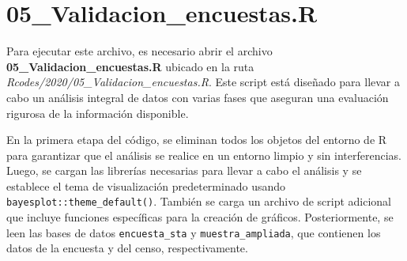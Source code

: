 \documentclass[
  12pt,
]{book}
\newenvironment{Shaded}{\begin{snugshade}}{\end{snugshade}}
\newcommand{\AttributeTok}[1]{\textcolor[rgb]{0.13,0.29,0.53}{#1}}
\newcommand{\CommentTok}[1]{\textcolor[rgb]{0.56,0.35,0.01}{\textit{#1}}}
\newcommand{\DecValTok}[1]{\textcolor[rgb]{0.00,0.00,0.81}{#1}}
\newcommand{\FunctionTok}[1]{\textcolor[rgb]{0.13,0.29,0.53}{\textbf{#1}}}
\newcommand{\NormalTok}[1]{#1}
\newcommand{\OtherTok}[1]{\textcolor[rgb]{0.56,0.35,0.01}{#1}}
\newcommand{\SpecialCharTok}[1]{\textcolor[rgb]{0.81,0.36,0.00}{\textbf{#1}}}
\newcommand{\StringTok}[1]{\textcolor[rgb]{0.31,0.60,0.02}{#1}}
\begin{document}
\begin{Shaded}
\end{Shaded}

\hypertarget{validacion_encuestas.r}{%
\chapter*{05\_Validacion\_encuestas.R}\label{validacion_encuestas.r}}

Para ejecutar este archivo, es necesario abrir el archivo \textbf{05\_Validacion\_encuestas.R} ubicado en la ruta \emph{Rcodes/2020/05\_Validacion\_encuestas.R}. Este script está diseñado para llevar a cabo un análisis integral de datos con varias fases que aseguran una evaluación rigurosa de la información disponible.

En la primera etapa del código, se eliminan todos los objetos del entorno de R para garantizar que el análisis se realice en un entorno limpio y sin interferencias. Luego, se cargan las librerías necesarias para llevar a cabo el análisis y se establece el tema de visualización predeterminado usando \texttt{bayesplot::theme\_default()}. También se carga un archivo de script adicional que incluye funciones específicas para la creación de gráficos. Posteriormente, se leen las bases de datos \texttt{encuesta\_sta} y \texttt{muestra\_ampliada}, que contienen los datos de la encuesta y del censo, respectivamente.
\end{document}
